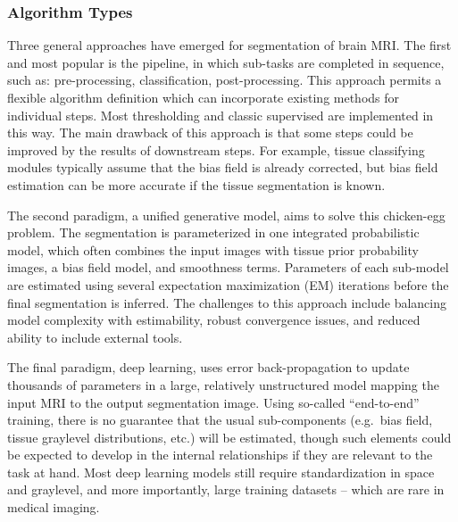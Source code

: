 \subsubsection{Algorithm Types}\label{sss:prior-models}
Three general approaches have emerged for segmentation of brain MRI.
The first and most popular is the pipeline,
in which sub-tasks are completed in sequence,
such as: pre-processing, classification, post-processing.
This approach permits a flexible algorithm definition
which can incorporate existing methods for individual steps.
Most thresholding and classic supervised are implemented in this way.
The main drawback of this approach is that
some steps could be improved by the results of downstream steps.
For example, tissue classifying modules typically assume that the bias field is already corrected,
but bias field estimation can be more accurate if the tissue segmentation is known.
\par
The second paradigm, a unified generative model, aims to solve this chicken-egg problem.
The segmentation is parameterized in one integrated probabilistic model,
which often combines the input images with
tissue prior probability images, a bias field model, and smoothness terms.
Parameters of each sub-model are estimated using several expectation maximization (EM) iterations
before the final segmentation is inferred.
The challenges to this approach include
balancing model complexity with estimability,
robust convergence issues,
and reduced ability to include external tools.
\par
The final paradigm, deep learning,
uses error back-propagation to update thousands of parameters
in a large, relatively unstructured model mapping the input MRI to the output segmentation image.
Using so-called ``end-to-end'' training, there is no guarantee that the usual sub-components
(e.g.\ bias field, tissue graylevel distributions, etc.) will be estimated,
though such elements could be expected to develop in the internal relationships
if they are relevant to the task at hand.
Most deep learning models still require standardization in space and graylevel,
and more importantly, large training datasets -- which are rare in medical imaging.
